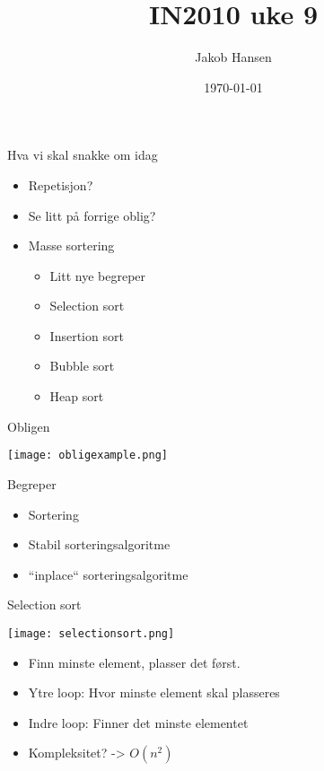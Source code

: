 \documentclass[norsk, handout]{beamer}
\title{IN2010 uke 9}
\author{Jakob Hansen}
\date{\today}
\begin{document}
	\frame{\titlepage}
    \begin{frame}{Hva vi skal snakke om idag}
      \begin{itemize}
          \item Repetisjon?
          \item Se litt på forrige oblig?
          \item Masse sortering
            \begin{itemize}
              \item Litt nye begreper
              \item Selection sort
              \item Insertion sort
              \item Bubble sort
              \item Heap sort

            \end{itemize}
      \end{itemize}
    \end{frame}


    \begin{frame}{Obligen}
      \begin{center}
        \texttt{[image: obligexample.png]}
      \end{center}
    \end{frame}
    \begin{frame}{Begreper}
      \begin{itemize}
          \item Sortering
          \item Stabil sorteringsalgoritme
          \item ``inplace`` sorteringsalgoritme
      \end{itemize}
    \end{frame}

    \begin{frame}{Selection sort}
      \begin{center}
        \texttt{[image: selectionsort.png]} 
      \end{center}
      \begin{itemize}
          \item Finn minste element, plasser det først.
          \item Ytre loop: Hvor minste element skal plasseres
          \item Indre loop: Finner det minste elementet
          \item Kompleksitet? \pause -> $O(n^2)$
      \end{itemize}
    \end{frame}
\end{document}
